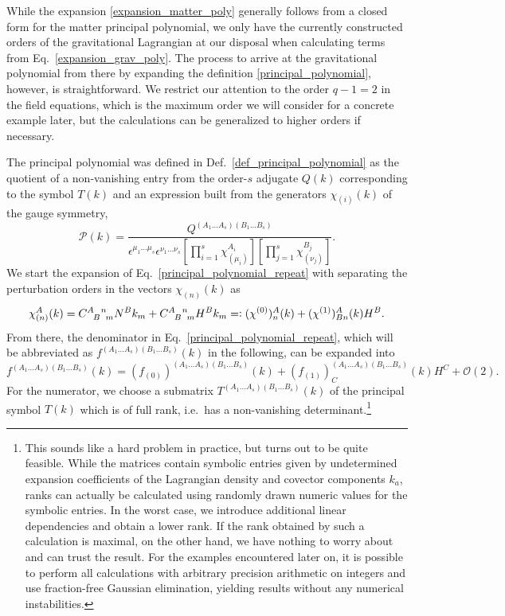 While the expansion \eqref{expansion_matter_poly} generally follows from a closed form for the matter principal polynomial, we only have the currently constructed orders of the gravitational Lagrangian at our disposal when calculating terms from Eq.~\ref{expansion_grav_poly}. The process to arrive at the gravitational polynomial from there by expanding the definition \eqref{principal_polynomial}, however, is straightforward. We restrict our attention to the order $q-1=2$ in the field equations, which is the maximum order we will consider for a concrete example later, but the calculations can be generalized to higher orders if necessary.

The principal polynomial was defined in Def.~\ref{def_principal_polynomial} as the quotient of a non-vanishing entry from the order-$s$ adjugate $Q(k)$ corresponding to the symbol $T(k)$ and an expression built from the generators $\chi_{(i)}(k)$ of the gauge symmetry,
\begin{equation}\label{principal_polynomial_repeat}
    \mathcal P(k) = \frac{Q^{(A_1\dots A_s)(B_1\dots B_s)}}{\epsilon^{\mu_1\dots\mu_s}\epsilon^{\nu_1\dots\nu_s}\left\lbrack\prod_{i=1}^s\chi_{(\mu_i)}^{A_i}\right\rbrack\left\lbrack\prod_{j=1}^s\chi_{(\nu_j)}^{B_j}\right\rbrack}.
\end{equation}
We start the expansion of Eq.~\ref{principal_polynomial_repeat} with separating the perturbation orders in the vectors $\chi_{(n)}(k)$ as 
\begin{equation}
  \chi_{(n)}^A(k) = \gmc{A}{B}{n}{m}N^Bk_m + \gmc{A}{B}{n}{m}H^Bk_m =\vcentcolon (\chi^{(0)})^A_n(k) + (\chi^{(1)})^A_{Bn}(k)H^B.
\end{equation}
From there, the denominator in Eq.~\ref{principal_polynomial_repeat}, which will be abbreviated as $f^{(A_1\dots A_s)(B_1\dots B_s)}(k)$ in the following, can be expanded into
\begin{equation}\label{expansion_f}
  f^{(A_1\dots A_s)(B_1\dots B_s)}(k) = (f_{(0)})^{(A_1\dots A_s)(B_1\dots B_s)}(k) + (f_{(1)})^{(A_1\dots A_s)(B_1\dots B_s)}_C(k)H^C + \mathcal O(2).
\end{equation}
For the numerator, we choose a submatrix $T^{(A_1\dots A_s)(B_1\dots B_s)}(k)$ of the principal symbol $T(k)$ which is of full rank, i.e.~has a non-vanishing determinant.\footnote{This sounds like a hard problem in practice, but turns out to be quite feasible. While the matrices contain symbolic entries given by undetermined expansion coefficients of the Lagrangian density and covector components $k_a$, ranks can actually be calculated using randomly drawn numeric values for the symbolic entries. In the worst case, we introduce additional linear dependencies and obtain a lower rank. If the rank obtained by such a calculation is maximal, on the other hand, we have nothing to worry about and can trust the result. For the examples encountered later on, it is possible to perform all calculations with arbitrary precision arithmetic on integers and use fraction-free Gaussian elimination, yielding results without any numerical instabilities.}
